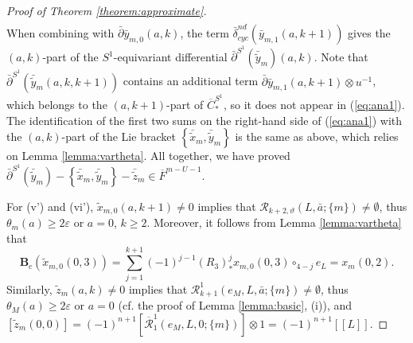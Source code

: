 \documentclass[a4paper]{article}
\numberwithin{equation}{section}
\begin{document}
\begin{proof}[Proof of Theorem \ref{theorem:approximate}]
\begin{equation}
\begin{split}
\end{split}
\end{equation}
When combining with $\bar{\partial}\bar{y}_{m,0}(a,k)$, the term $\bar{\delta}_\mathit{cyc}^\mathit{nd}\left(\bar{y}_{m,1}(a,k+1)\right)$ gives the $(a,k)$-part of the $S^1$-equivariant differential $\bar{\partial}^{S^1}(\bar{\tilde{y}}_m)(a,k)$. Note that $\bar{\partial}^{S^1}\left(\bar{\tilde{y}}_m(a,k,k+1)\right)$ contains an additional term $\bar{\partial}\bar{y}_{m,1}(a,k+1)\otimes u^{-1}$, which belongs to the $(a,k+1)$-part of $\overline{C}_\ast^{S^1}$, so it does not appear in (\ref{eq:ana1}). The identification of the first two sums on the right-hand side of (\ref{eq:ana1}) with the $(a,k)$-part of the Lie bracket $\left\{\bar{\tilde{x}}_m,\bar{\tilde{y}}_m\right\}$ is the same as above, which relies on Lemma \ref{lemma:vartheta}. All together, we have proved $\bar{\partial}^{S^1}(\bar{\tilde{y}}_m)-\left\{\bar{\tilde{x}}_m,\bar{\tilde{y}}_m\right\}-\bar{\tilde{z}}_m\in\overline{F}^{m-U-1}$.

For (v') and (vi'), $\tilde{x}_{m,0}(a,k+1)\neq0$ implies that $\mathcal{R}_{k+2,\vartheta}(L,\bar{a};\{m\})\neq\emptyset$, thus $\theta_m(a)\geq2\varepsilon$ or $a=0$, $k\geq2$. Moreover, it follows from Lemma \ref{lemma:vartheta} that
\begin{equation}
\mathbf{B}_c\left(\tilde{x}_{m,0}(0,3)\right)=\sum_{j=1}^{k+1}(-1)^{j-1}(R_3)_\ast^jx_{m,0}(0,3)\circ_{4-j}e_L=x_m(0,2).
\end{equation}
Similarly, $\tilde{z}_m(a,k)\neq0$ implies that $\mathcal{R}_{k+1}^1(e_M,L,\bar{a};\{m\})\neq\emptyset$, thus $\theta_M(a)\geq2\varepsilon$ or $a=0$ (cf. the proof of Lemma \ref{lemma:basic}, (i)), and $\left[\tilde{z}_m(0,0)\right]=(-1)^{n+1}\left[\overline{\mathcal{R}}_1^1(e_M,L,0;\{m\})\right]\otimes1=(-1)^{n+1}[\![L]\!]$.


\end{proof}
\end{document}
